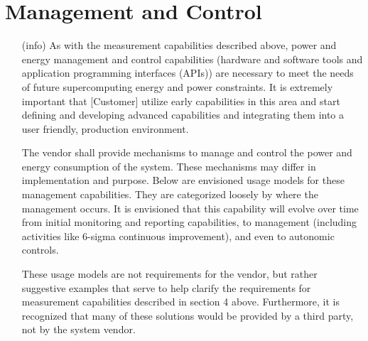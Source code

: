 \section{Management and Control}
\begin{itemize}
\item[(info)]
As with the measurement capabilities described above, power and energy management and control capabilities (hardware and software tools and application programming interfaces (APIs)) are necessary to meet the needs of future supercomputing energy and power constraints. It is extremely important that [Customer] utilize early capabilities in this area and start defining and developing advanced capabilities and integrating them into a user friendly, production environment.  

	The vendor shall provide mechanisms to manage and control the power and energy consumption of the system. These mechanisms may differ in implementation and purpose.  Below are envisioned usage models for these management capabilities.  They are categorized loosely by where the management occurs. It is envisioned that this capability will evolve over time from initial monitoring and reporting capabilities, to management (including activities like 6-sigma continuous improvement), and even to autonomic controls.   

	These usage models are not requirements for the vendor, but rather suggestive examples that serve to help clarify the requirements for measurement capabilities described in section 4 above. Furthermore, it is recognized that many of these solutions would be provided by a third party, not by the system vendor.  
\end{itemize}

